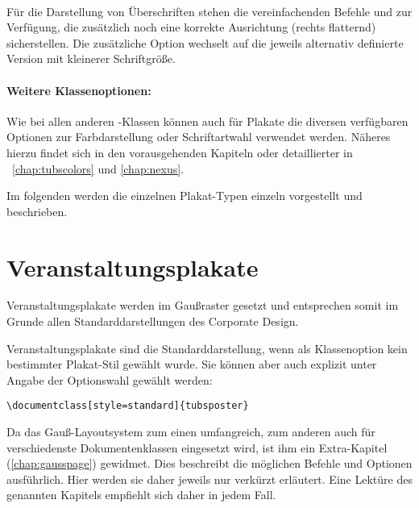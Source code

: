 \begin{Declaration}
  \\
\end{Declaration}

Für die Darstellung von Überschriften stehen die vereinfachenden
Befehle  und  zur Verfügung,
die zusätzlich noch eine korrekte Ausrichtung (rechts flatternd) sicherstellen.
Die zusätzliche Option  wechselt auf die jeweils alternativ
definierte Version mit kleinerer Schriftgröße.


\paragraph{Weitere Klassenoptionen:}

Wie bei allen anderen \tubslatex-Klassen können auch für Plakate
die diversen verfügbaren Optionen zur Farbdarstellung oder Schriftartwahl
verwendet werden.
Näheres hierzu findet sich in den vorausgehenden Kapiteln oder detaillierter
in \chaptername~\ref{chap:tubscolors} und \ref{chap:nexus}.
\bigskip

Im folgenden werden die einzelnen Plakat-Typen einzeln vorgestellt und beschrieben.

\clearpage
\section{Veranstaltungsplakate}

Veranstaltungsplakate werden im Gaußraster gesetzt und entsprechen somit
im Grunde allen Standarddarstellungen des Corporate Design.

Veranstaltungsplakate sind die Standarddarstellung, wenn als Klassenoption
kein bestimmter Plakat-Stil gewählt wurde. Sie können aber auch explizit
unter Angabe der Optionswahl  gewählt werden:
\begin{lstlisting}
\documentclass[style=standard]{tubsposter}
\end{lstlisting}

Da das Gauß-Layoutsystem zum einen umfangreich, zum anderen auch für
verschiedenste Dokumentenklassen eingesetzt wird,
ist ihm ein Extra-Kapitel (\ref{chap:gausspage}) gewidmet.
Dies beschreibt die möglichen Befehle und Optionen ausführlich.
Hier werden sie daher jeweils nur verkürzt erläutert.
Eine Lektüre des genannten Kapitels empfiehlt sich daher in jedem Fall.


